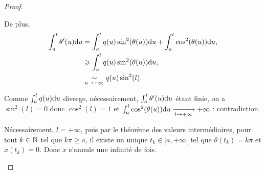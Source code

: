 \documentclass[12pt]{article}
\begin{document}
\begin{proof}
\begin{enumerate}
		De plus, 
		\begin{align*}
			\int_{a}^{t}\theta'(u)\mathrm{d} u
			&=\int_{a}^{t}q(u)\sin^{2}(\theta(u))\mathrm{d} u+\int_{a}^{t}\cos^{2}(\theta(u))\mathrm{d} u,\\
			&\geqslant\int_{a}^{t}q(u)\sin^{2}(\theta(u))\mathrm{d} u,\\
			&\underset{u\to+\infty}{\sim}q(u)\sin^{2}(l).
		\end{align*}

		Comme $\int_{a}^{t}q(u)\mathrm{d} u$ diverge, nécessairement, $\int_{a}^{t}\theta'(u)\mathrm{d} u$ étant finie, on a $\sin^{2}(l)=0$ donc $\cos^{2}(l)=1$ et 
		$\int_{a}^{t}\cos^{2}(\theta(u))\mathrm{d} u\xrightarrow[t\to+\infty]{}+\infty$ : contradiction. 

		Nécessairement, $l=+\infty$, puis par le théorème des valeurs intermédiaires, pour tout $k\in\mathbb{N}$ tel que $k\pi\geqslant a$, il existe un unique $t_k\in[a,+\infty[$ tel que $\theta(t_k)=k\pi$ et $x(t_k)=0$. Donc $x$ s'annule une infinité de fois.
	\end{enumerate}
\end{proof}
\end{document}
